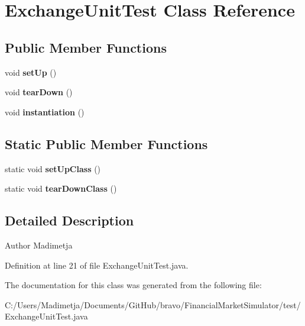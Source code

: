 \hypertarget{class_exchange_unit_test}{\section{Exchange\+Unit\+Test Class Reference}
\label{class_exchange_unit_test}
}
\subsection*{Public Member Functions}
\begin{DoxyCompactItemize}
\item 
\hypertarget{class_exchange_unit_test_a61dd0af902dc0da5513c53a2dc797b33}{void {\bfseries set\+Up} ()}\label{class_exchange_unit_test_a61dd0af902dc0da5513c53a2dc797b33}

\item 
\hypertarget{class_exchange_unit_test_a58164607cebb6763d2c7ab8866988cfb}{void {\bfseries tear\+Down} ()}\label{class_exchange_unit_test_a58164607cebb6763d2c7ab8866988cfb}

\item 
\hypertarget{class_exchange_unit_test_a7196c89003b25fcbe16ce03c95ad3cb6}{void {\bfseries instantiation} ()}\label{class_exchange_unit_test_a7196c89003b25fcbe16ce03c95ad3cb6}

\end{DoxyCompactItemize}
\subsection*{Static Public Member Functions}
\begin{DoxyCompactItemize}
\item 
\hypertarget{class_exchange_unit_test_abaa84464701e883f0938e6fdbe2b72b5}{static void {\bfseries set\+Up\+Class} ()}\label{class_exchange_unit_test_abaa84464701e883f0938e6fdbe2b72b5}

\item 
\hypertarget{class_exchange_unit_test_aeb8675a172645bd95fe665ad75f92bd5}{static void {\bfseries tear\+Down\+Class} ()}\label{class_exchange_unit_test_aeb8675a172645bd95fe665ad75f92bd5}

\end{DoxyCompactItemize}


\subsection{Detailed Description}
\begin{DoxyAuthor}{Author}
Madimetja 
\end{DoxyAuthor}


Definition at line 21 of file Exchange\+Unit\+Test.\+java.



The documentation for this class was generated from the following file\+:\begin{DoxyCompactItemize}
\item 
C\+:/\+Users/\+Madimetja/\+Documents/\+Git\+Hub/bravo/\+Financial\+Market\+Simulator/test/Exchange\+Unit\+Test.\+java\end{DoxyCompactItemize}
